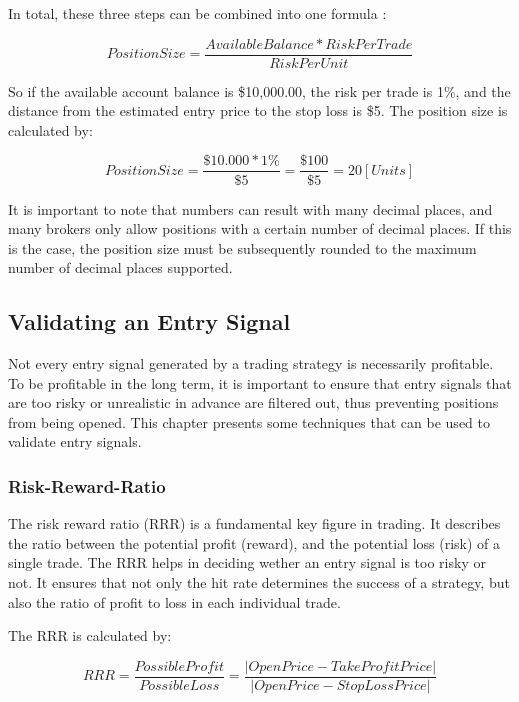 In total, these three steps can be combined into one formula \cite{britannica-position-size}:

\begin{equation}
    PositionSize = \frac{Available Balance*RiskPerTrade}{RiskPerUnit}
\end{equation}

So if the available account balance is \$10,000.00, the risk per trade is 1\%, and the distance from the estimated entry price to the stop loss is \$5.
The position size is calculated by:

\begin{equation}
    PositionSize = \frac{\$10.000*1\%}{\$5}=\frac{\$100}{\$5}=20 [Units]
\end{equation}

It is important to note that numbers can result with many decimal places, and many brokers only allow positions with a certain number of decimal places.
If this is the case, the position size must be subsequently rounded to the maximum number of decimal places supported.

\subsection{Validating an Entry Signal}

Not every entry signal generated by a trading strategy is necessarily profitable.
To be profitable in the long term, it is important to ensure that entry signals that are too risky or unrealistic in advance are filtered out, thus preventing positions from being opened.
This chapter presents some techniques that can be used to validate entry signals.

\subsubsection{Risk-Reward-Ratio}

The risk reward ratio (RRR) is a fundamental key figure in trading.
It describes the ratio between the potential profit (reward), and the potential loss (risk) of a single trade.
The RRR helps in deciding wether an entry signal is too risky or not.
It ensures that not only the hit rate determines the success of a strategy, but also the ratio of profit to loss in each individual trade.

The RRR is calculated by:

\begin{equation}
    RRR = \frac{PossibleProfit}{PossibleLoss} = \frac{|OpenPrice - TakeProfitPrice|}{|OpenPrice - StopLossPrice|}
\end{equation}

